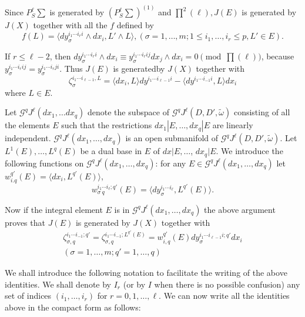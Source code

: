 Since $P^\ell_S \sum$ is generated by $(P^\ell_S \sum)^{(1)}$ and
$\prod^2 (\ell), J(E)$ is generated by $J(X)$ together with all the
$f$ defined by  
$$
f(L) = \langle dy_{\sigma}^{i_1 \cdots i_r i} \wedge dx_i , L' \wedge
L \rangle, (\sigma = 1 , \ldots, m; 1 \leq i_1, \ldots, i_r \leq p, L'
\in E). 
$$ 

If $r \leq \ell -2$, then $dy_{\sigma}^{i_1 \cdots i_r i} \wedge dx_i
\equiv y_{\sigma}^{i_1 \cdots i_r i j} dx_j \wedge dx_i =0 \pmod{\prod
(\ell)}$, because $y_{\sigma}^{i_1 \cdots i_r ij} = y_{\sigma}^{i_1
  \cdots i_r ji}$. Thus $J(E)$ is generated\pageoriginale by $J(X)$ together with 
$$
\zeta_{\sigma}^{i_1 \cdots i_{\ell -1},L} = \langle dx_i, L \rangle
dy^{i_1\cdots i_{\ell -1} i} - \langle dy^{i_1 \cdots i_{-1}i}, L
\rangle dx_i  
$$
where $L \in E$.

Let $\mathscr{G}^q J^{\ell} (dx_1, \ldots dx_q)$ denote the subspace
of $\mathscr{G}^q J^{\ell} (D, D', \tilde{\omega})$ consisting of all
the elements $E$ such that the restrictions $dx_1 |E, \ldots , dx_q|
E$ are linearly independent.  
$\mathscr{G}^q J^{\ell} (dx_1, \ldots, dx_q)$ is an open submanifold
of $\mathscr{G}^q J^{\ell} (D, D', \tilde{\omega})$. Let $L^1 (E) ,
\ldots , L^q (E)$ be a dual base in $E$ of $dx |E, \ldots$,
$dx_q|E$. We introduce the following functions on $\mathscr{G}^q
J^{\ell} (dx_1, \ldots, dx_q)$: for any $E \in \mathscr{G}^q J^{\ell}
(dx_1, \ldots, dx_q)$ let $w_{i.q}^{q'}(E) = \langle dx_i , L^{q'} (E)
\rangle$, 
$$
w_{\sigma~ q}^{i_1 \cdots i_{\ell}; q'} (E) = \langle dy_{\sigma}^{i_1
  \cdots i_\ell}, L^{q'} (E) \rangle. 
$$

Now  if the integral element $E$ is in $\mathscr{G}^q J^{\ell} (dx_1,
\ldots , dx_q)$ the above argument proves that $J(E)$ is generated by
$J(X)$ together with  
\begin{gather*}
  \zeta_{\sigma, q}^{i_1 \cdots i_{-1}; q'} = \zeta_{\sigma, q}^{i_1
    \cdots i_{-1};  L^{q'}(E)}= w^{q'}_{i,q} (E) dy_{\sigma}^{i_1 \cdots
    i_{\ell -1} i; q'} dx_{i}\\ 
  (\sigma = 1,\ldots , m ; q'=1, \ldots , q)
\end{gather*} 

We shall introduce the following notation to facilitate the writing of
the above identities. We shall denote by $I_r$ (or by $I$ when there
is no possible confusion) any set of indices $(i_1, \ldots , i_r)$ for
$r=0, 1,\ldots,\ell$. We can now write all the identities above in the\pageoriginale
compact form as follows: 

